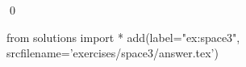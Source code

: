 
\begin{ex} 
  \label{ex:space3}
  
  \qed
\end{ex} 
\begin{python0}
from solutions import *
add(label="ex:space3",
    srcfilename='exercises/space3/answer.tex') 
\end{python0}
